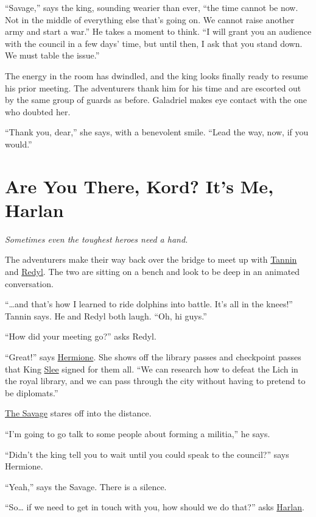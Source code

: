 \documentclass[smalldemyvopaper,11pt,twoside,onecolumn,openright,extrafontsizes]{memoir}
\newcommand{\chapdesc}[1]{
    \begin{flushright}
    \emph{{#1}}
    \end{flushright}
    \vspace{26pt}
}
\begin{document}
``Savage,'' says the king, sounding wearier than ever, ``the time cannot
be now. Not in the middle of everything else that's going on. We cannot
raise another army and start a war.'' He takes a moment to think. ``I
will grant you an audience with the council in a few days' time, but
until then, I ask that you stand down. We must table the issue.''

The energy in the room has dwindled, and the king looks finally ready to
resume his prior meeting. The adventurers thank him for his time and are
escorted out by the same group of guards as before. Galadriel makes eye
contact with the one who doubted her.

``Thank you, dear,'' she says, with a benevolent smile. ``Lead the way,
now, if you would.''


\chapter{Are You There, Kord? It's Me, Harlan}
\chapdesc{Sometimes even the toughest heroes need a hand.}

The adventurers make their way back over the bridge to meet up with
\href{/characters/tannin/}{Tannin} and \href{/characters/redyl/}{Redyl}.
The two are sitting on a bench and look to be deep in an animated
conversation.

``\ldots and that's how I learned to ride dolphins into battle. It's all
in the knees!'' Tannin says. He and Redyl both laugh. ``Oh, hi guys.''

``How did your meeting go?'' asks Redyl.

``Great!'' says \href{/characters/hermione/}{Hermione}. She shows off
the library passes and checkpoint passes that King
\href{/characters/slee/}{Slee} signed for them all. ``We can research
how to defeat the Lich in the royal library, and we can pass through the
city without having to pretend to be diplomats.''

\href{/characters/the-savage/}{The Savage} stares off into the distance.

``I'm going to go talk to some people about forming a militia,'' he
says.

``Didn't the king tell you to wait until you could speak to the
council?'' says Hermione.

``Yeah,'' says the Savage. There is a silence.

``So\ldots{} if we need to get in touch with you, how should we do
that?'' asks \href{/characters/harlan/}{Harlan}.
\end{document}
